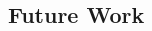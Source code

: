 \documentclass[12pt]{article}
\begin{document}
\begin{multicols*}{2}
  \section{Future Work}

\end{multicols*}



\end{document}
